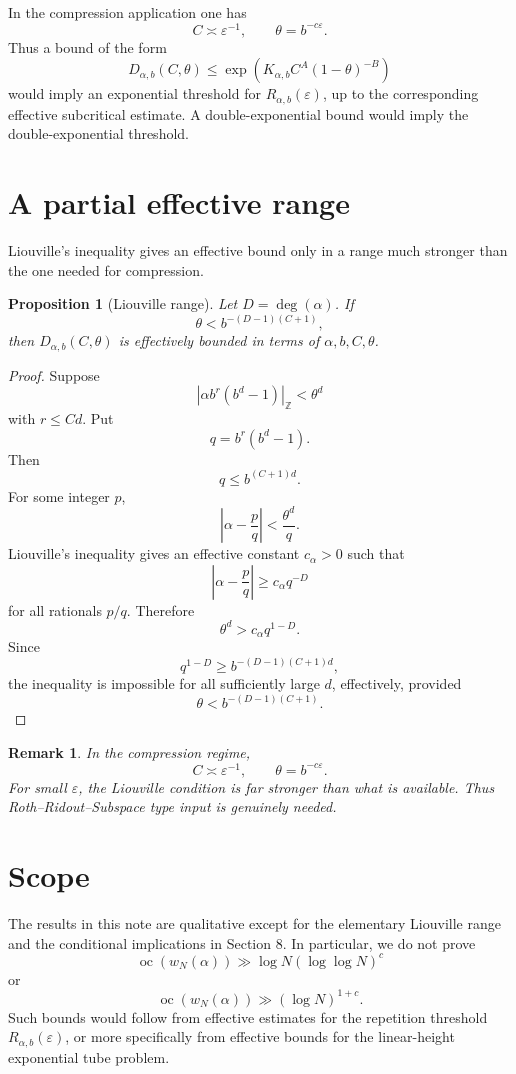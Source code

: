 \documentclass[11pt]{amsart}
\newtheorem{proposition}[theorem]{Proposition}
\newtheorem{remark}[theorem]{Remark}
\DeclareMathOperator{\oc}{oc}
\newcommand{\normZ}[1]{\left|#1\right|_{\mathbb Z}}
\begin{document}
In the compression application one has
\[
C\asymp \varepsilon^{-1},
\qquad
\theta=b^{-c\varepsilon}.
\]
Thus a bound of the form
\[
D_{\alpha,b}(C,\theta)
\leq
\exp\left(K_{\alpha,b}C^A(1-\theta)^{-B}\right)
\]
would imply an exponential threshold for \(R_{\alpha,b}(\varepsilon)\), up to the corresponding effective subcritical estimate. A double-exponential bound would imply the double-exponential threshold.

\section{A partial effective range}

Liouville's inequality gives an effective bound only in a range much stronger than the one needed for compression.

\begin{proposition}[Liouville range]
Let \(D=\deg(\alpha)\). If
\[
\theta<b^{-(D-1)(C+1)},
\]
then \(D_{\alpha,b}(C,\theta)\) is effectively bounded in terms of \(\alpha,b,C,\theta\).
\end{proposition}

\begin{proof}
Suppose
\[
\normZ{\alpha b^r(b^d-1)}<\theta^d
\]
with \(r\leq Cd\). Put
\[
q=b^r(b^d-1).
\]
Then
\[
q\leq b^{(C+1)d}.
\]
For some integer \(p\),
\[
\left|\alpha-\frac{p}{q}\right|
<
\frac{\theta^d}{q}.
\]
Liouville's inequality gives an effective constant \(c_\alpha>0\) such that
\[
\left|\alpha-\frac{p}{q}\right|
\geq
c_\alpha q^{-D}
\]
for all rationals \(p/q\). Therefore
\[
\theta^d>c_\alpha q^{1-D}.
\]
Since
\[
q^{1-D}\geq b^{-(D-1)(C+1)d},
\]
the inequality is impossible for all sufficiently large \(d\), effectively, provided
\[
\theta<b^{-(D-1)(C+1)}.
\]
\end{proof}

\begin{remark}
In the compression regime,
\[
C\asymp\varepsilon^{-1},
\qquad
\theta=b^{-c\varepsilon}.
\]
For small \(\varepsilon\), the Liouville condition is far stronger than what is available. Thus Roth--Ridout--Subspace type input is genuinely needed.
\end{remark}

\section{Scope}

The results in this note are qualitative except for the elementary Liouville range and the conditional implications in Section 8. In particular, we do not prove
\[
\oc(w_N(\alpha))\gg \log N(\log\log N)^c
\]
or
\[
\oc(w_N(\alpha))\gg(\log N)^{1+c}.
\]
Such bounds would follow from effective estimates for the repetition threshold \(R_{\alpha,b}(\varepsilon)\), or more specifically from effective bounds for the linear-height exponential tube problem.
\end{document}
